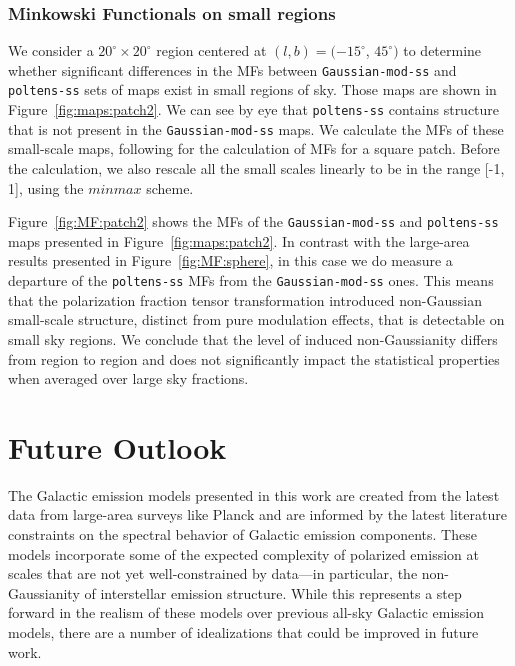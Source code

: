 \documentclass[twocolumn]{aastex631}
\begin{document}
\subsubsection{Minkowski Functionals on small regions}
We consider a $20^{\circ}\times20^{\circ}$ region centered at $(l, b) = (-15^{\circ}$, $45^{\circ})$ to determine whether significant differences in the MFs between \texttt{Gaussian-mod-ss} and \texttt{poltens-ss} sets of maps exist in small regions of sky. Those maps are shown in Figure~\ref{fig:maps:patch2}. We can see by eye that \texttt{poltens-ss} contains structure that is not present in the \texttt{Gaussian-mod-ss} maps. We calculate the MFs of these small-scale maps, following \cite{Mantz:2008} for the calculation of MFs for a square patch. Before the calculation, we also rescale all the small scales linearly to be in the range [-1, 1], using the $minmax$ scheme.

Figure~\ref{fig:MF:patch2} shows the MFs of the \texttt{Gaussian-mod-ss} and \texttt{poltens-ss} maps presented in Figure~\ref{fig:maps:patch2}. In contrast with the large-area results presented in Figure~\ref{fig:MF:sphere}, in this case we do measure a departure of the \texttt{poltens-ss} MFs from the \texttt{Gaussian-mod-ss} ones. This means that the polarization fraction tensor transformation introduced non-Gaussian small-scale structure, distinct from pure modulation effects, that is detectable on small sky regions. We conclude that the level of induced non-Gaussianity differs from region to region and does not significantly impact the statistical properties when averaged over large sky fractions.

\section{Future Outlook} \label{sec:discussion}

The Galactic emission models presented in this work are created from the latest data from large-area surveys like Planck and are informed by the latest literature constraints on the spectral behavior of Galactic emission components. These models incorporate some of the expected complexity of polarized emission at scales that are not yet well-constrained by data---in particular, the non-Gaussianity of interstellar emission structure. While this represents a step forward in the realism of these models over previous all-sky Galactic emission models, there are a number of idealizations that could be improved in future work.
\end{document}
